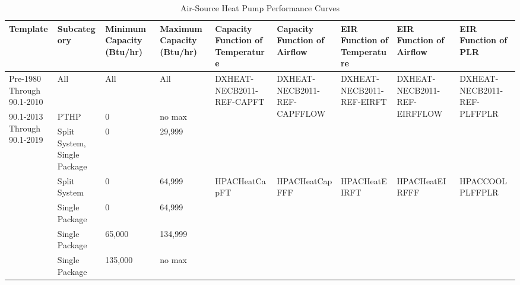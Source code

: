 \begin{table}[]
\scriptsize
\centering
\caption{Air-Source Heat Pump Performance Curves}
\label{tab:ashp_curves}
\begin{tabular}{|p{0.4in}|p{0.5in}|p{0.4in}|p{0.4in}|p{0.5in}|p{0.5in}|p{0.5in}|p{0.5in}|p{0.5in}|}
\hline
\textbf{Template} &
  \textbf{Subcategory} &
  \textbf{Minimum   Capacity (Btu/hr)} &
  \textbf{Maximum   Capacity (Btu/hr)} &
  \textbf{Capacity Function of Temperature} &
  \textbf{Capacity Function of Airflow} &
  \textbf{EIR Function of Temperature} &
  \textbf{EIR Function of Airflow} &
  \textbf{EIR Function of PLR} \\ \hline
Pre-1980 Through 90.1-2010 &
  All &
  All &
  All &
  \multirow{3}{*}{\parbox{0.4in}{DXHEAT-NECB2011-REF-CAPFT}} &
  \multirow{3}{*}{\parbox{0.4in}{DXHEAT-NECB2011-REF-CAPFFLOW}} &
  \multirow{3}{*}{\parbox{0.4in}{DXHEAT-NECB2011-REF-EIRFT}} &
  \multirow{3}{*}{\parbox{0.4in}{DXHEAT-NECB2011-REF-EIRFFLOW}} &
  \multirow{3}{*}{\parbox{0.4in}{DXHEAT-NECB2011-REF-PLFFPLR}} \\ \cline{1-4}
\multirow{6}{*}{\parbox{0.4in}{90.1-2013 Through 90.1-2019}} & PTHP                           & 0       & no max    &  &  &  &  &  \\ \cline{2-4}
                                                            & Split   System, Single Package & 0       & 29,999    &  &  &  &  &  \\ \cline{2-9} 
 &
  Split   System &
  0 &
  64,999 &
  \multirow{4}{*}{\parbox{0.4in}{HPACHeat\-CapFT}} &
  \multirow{4}{*}{\parbox{0.4in}{HPACHeat\-CapFFF}} &
  \multirow{4}{*}{\parbox{0.4in}{HPACHeat\-EIRFT}} &
  \multirow{4}{*}{\parbox{0.4in}{HPACHeat\-EIRFFF}} &
  \multirow{4}{*}{\parbox{0.4in}{HPACCOOL\-PLFFPLR}} \\ \cline{2-4}
                                                            & Single   Package               & 0       & 64,999    &  &  &  &  &  \\ \cline{2-4}
                                                            & Single   Package               & 65,000  & 134,999   &  &  &  &  &  \\ \cline{2-4}
                                                            & Single   Package               & 135,000 & no max    &  &  &  &  &  \\ \hline
\end{tabular}
\end{table}
